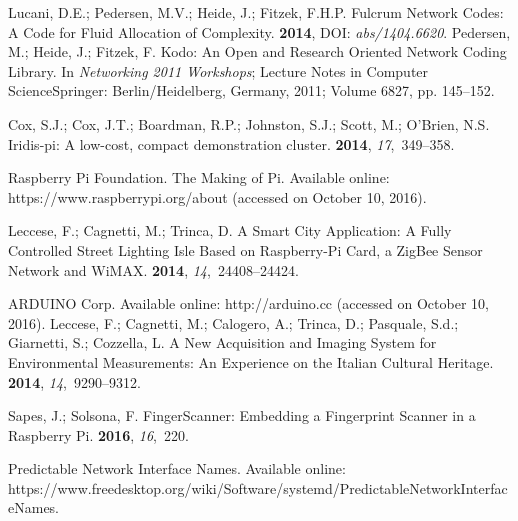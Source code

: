 \documentclass[electronics,article,accept,moreauthors,pdftex,10pt,a4paper]{mdpi}
\theoremstyle{mdpi}
\newcounter{ex}
\newcounter{re}
\theoremstyle{mdpidefinition}
\begin{document}
\begin{thebibliography}{999}
Lucani, D.E.; Pedersen, M.V.; Heide, J.; Fitzek, F.H.P.
\newblock Fulcrum Network Codes: {A} Code for Fluid Allocation of Complexity.
 {\bf 2014}, DOI: {\em abs/1404.6620}.
Pedersen, M.; Heide, J.; Fitzek, F.
\newblock Kodo: An Open and Research Oriented Network Coding Library. In {\em
  Networking 2011 Workshops}; Lecture   Notes in Computer ScienceSpringer: Berlin/Heidelberg, Germany,  2011; Volume 6827, pp. 145--152.

Cox, S.J.; Cox, J.T.; Boardman, R.P.; Johnston, S.J.; Scott, M.; O'Brien, N.S.
\newblock Iridis-pi: A low-cost, compact demonstration cluster.
 {\bf 2014}, {\em 17},~349--358.

Raspberry Pi Foundation. The Making of Pi.
\newblock Available online: https://www.raspberrypi.org/about (accessed on October 10, 2016).

Leccese, F.; Cagnetti, M.; Trinca, D.
\newblock A Smart City Application: A Fully Controlled Street Lighting Isle
  Based on Raspberry-Pi Card, a ZigBee Sensor Network and WiMAX.
 {\bf 2014}, {\em 14},~24408--24424.

ARDUINO Corp.
\newblock Available online: http://arduino.cc (accessed on October 10, 2016).
Leccese, F.; Cagnetti, M.; Calogero, A.; Trinca, D.; Pasquale, S.d.; Giarnetti,
  S.; Cozzella, L.
\newblock A New Acquisition and Imaging System for Environmental Measurements:
  An Experience on the Italian Cultural Heritage.
 {\bf 2014}, {\em 14},~9290--9312.

Sapes, J.; Solsona, F.
\newblock FingerScanner: Embedding a Fingerprint Scanner in a Raspberry Pi.
 {\bf 2016}, {\em 16},~220.

Predictable Network Interface Names. 
  Available online:  https://www.freedesktop.org/wiki/Software/\linebreak systemd/PredictableNetworkInterfaceNames.


\end{thebibliography}
\end{document}
